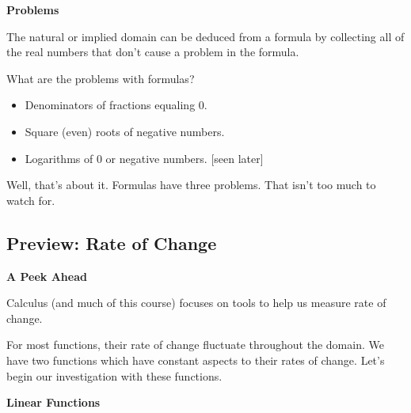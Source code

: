 \documentclass{ximera}
\begin{document}
\begin{warning} \textbf{\textcolor{red!70!darkgray}{Problems}}   

The natural or implied domain can be deduced from a formula by collecting all of the real numbers that don't cause a problem in the formula. 

What are the problems with formulas?

\begin{itemize}
\item  Denominators of fractions equaling $0$. \\
\item  Square (even) roots of negative numbers.    \\
\item  Logarithms of $0$ or negative numbers.  [seen later] 
\end{itemize}

Well, that's about it.  Formulas have three problems.  That isn't too much to watch for.


\end{warning}
































\subsection*{Preview: Rate of Change}
\textbf{\textcolor{red!70!black}{A Peek Ahead}}


Calculus (and much of this course) focuses on tools to help us measure rate of change. 


For most functions, their rate of change fluctuate throughout the domain.  We have two functions which have constant aspects to their rates of change.  Let's begin our investigation with these functions.






\textbf{\textcolor{purple!85!blue}{Linear Functions}}
\end{document}
